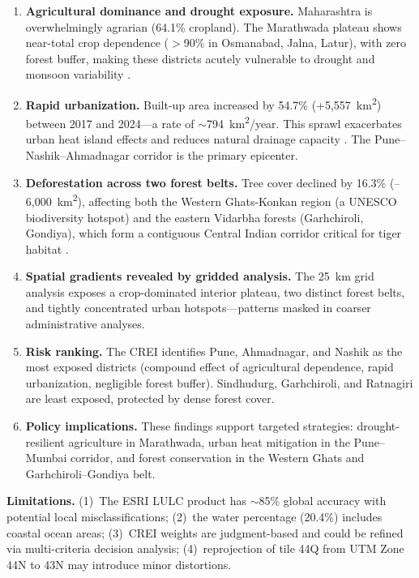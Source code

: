 \documentclass[12pt,a4paper]{article}
\begin{document}
\begin{enumerate}
    \item \textbf{Agricultural dominance and drought exposure.} Maharashtra is overwhelmingly agrarian (64.1\% cropland). The Marathwada plateau shows near-total crop dependence ($>$90\% in Osmanabad, Jalna, Latur), with zero forest buffer, making these districts acutely vulnerable to drought and monsoon variability \citep{gadgil2003indian}.

    \item \textbf{Rapid urbanization.} Built-up area increased by 54.7\% (+5,557~km\textsuperscript{2}) between 2017 and 2024---a rate of $\sim$794~km\textsuperscript{2}/year. This sprawl exacerbates urban heat island effects and reduces natural drainage capacity \citep{oke1982energetic}. The Pune--Nashik--Ahmadnagar corridor is the primary epicenter.

    \item \textbf{Deforestation across two forest belts.} Tree cover declined by 16.3\% (--6,000~km\textsuperscript{2}), affecting both the Western Ghats-Konkan region (a UNESCO biodiversity hotspot) and the eastern Vidarbha forests (Garhchiroli, Gondiya), which form a contiguous Central Indian corridor critical for tiger habitat \citep{myers2000biodiversity}.

    \item \textbf{Spatial gradients revealed by gridded analysis.} The 25~km grid analysis exposes a crop-dominated interior plateau, two distinct forest belts, and tightly concentrated urban hotspots---patterns masked in coarser administrative analyses.

    \item \textbf{Risk ranking.} The CREI identifies Pune, Ahmadnagar, and Nashik as the most exposed districts (compound effect of agricultural dependence, rapid urbanization, negligible forest buffer). Sindhudurg, Garhchiroli, and Ratnagiri are least exposed, protected by dense forest cover.

    \item \textbf{Policy implications.} These findings support targeted strategies: drought-resilient agriculture in Marathwada, urban heat mitigation in the Pune--Mumbai corridor, and forest conservation in the Western Ghats and Garhchiroli--Gondiya belt.
\end{enumerate}

\textbf{Limitations.} (1)~The ESRI LULC product has $\sim$85\% global accuracy with potential local misclassifications; (2)~the water percentage (20.4\%) includes coastal ocean areas; (3)~CREI weights are judgment-based and could be refined via multi-criteria decision analysis; (4)~reprojection of tile 44Q from UTM Zone 44N to 43N may introduce minor distortions.
\end{document}
